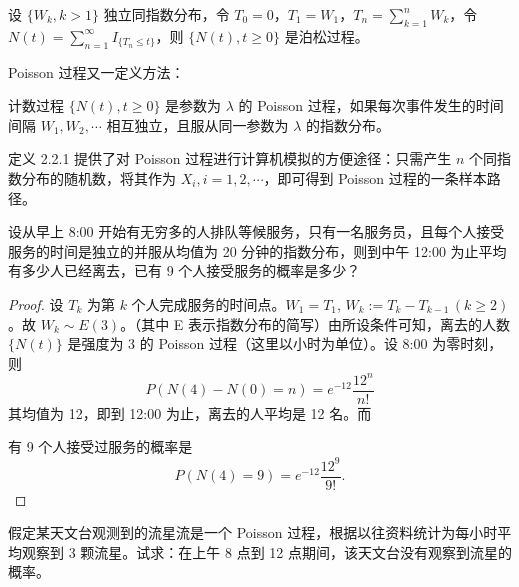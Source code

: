 \documentclass[lang=cn,10pt,thmcnt=section]{elegantbook}
\begin{document}
\begin{proposition}
	设 $\{W_k, k > 1\}$ 独立同指数分布，令 $T_0 = 0$，$T_1 = W_1$，$T_n = \sum_{k=1}^{n} W_k$，令 $N(t) = \sum_{n=1}^{\infty} I_{\{T_n \leq t\}}$，则 $\{N(t), t \geq 0\}$ 是泊松过程。

\end{proposition}

Poisson 过程又一定义方法：
\begin{definition}
	\quad 计数过程 $\{N(t), t \geq 0\}$ 是参数为 $\lambda$ 的 Poisson 过程，如果每次事件发生的时间间隔 $W_1, W_2, \cdots$ 相互独立，且服从同一参数为 $\lambda$ 的指数分布。
\end{definition}

定义 2.2.1 提供了对 Poisson 过程进行计算机模拟的方便途径：只需产生 $n$ 个同指数分布的随机数，将其作为 $X_i, i = 1, 2, \cdots$，即可得到 Poisson 过程的一条样本路径。

\begin{example}
	设从早上 8:00 开始有无穷多的人排队等候服务，只有一名服务员，且每个人接受服务的时间是独立的并服从均值为 20 分钟的指数分布，则到中午 12:00 为止平均有多少人已经离去，已有 9 个人接受服务的概率是多少？
\end{example}
\begin{proof}
	设 $T_k$ 为第 $k$ 个人完成服务的时间点。$W_1 = T_1$, $W_k := T_k - T_{k-1} \, (k \geq 2)$。故 $W_k \sim E(3)$。（其中 E 表示指数分布的简写）由所设条件可知，离去的人数 $\{N(t)\}$ 是强度为 3 的 Poisson 过程（这里以小时为单位）。设 8:00 为零时刻，则
\[
P(N(4) - N(0) = n) = e^{-12} \frac{12^n}{n!}
\]
其均值为 12，即到 12:00 为止，离去的人平均是 12 名。而

有 9 个人接受过服务的概率是
\[
P(N(4) = 9) = e^{-12} \frac{12^9}{9!}.
\]
\end{proof}
\begin{example}
	假定某天文台观测到的流星流是一个 Poisson 过程，根据以往资料统计为每小时平均观察到 3 颗流星。试求：在上午 8 点到 12 点期间，该天文台没有观察到流星的概率。
\end{example}
\end{document}
